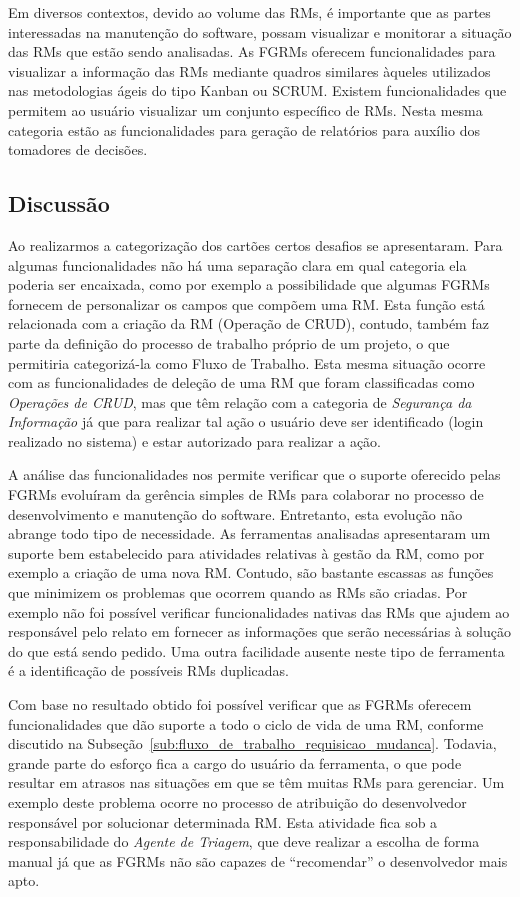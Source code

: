 Em diversos contextos, devido ao volume das RMs, é importante que as partes
interessadas na manutenção do software, possam visualizar e monitorar a situação
das RMs que estão sendo analisadas. As FGRMs oferecem funcionalidades para
visualizar a informação das RMs mediante quadros similares àqueles utilizados
nas metodologias ágeis do tipo Kanban ou SCRUM\@. Existem funcionalidades que
permitem ao usuário visualizar um conjunto específico de RMs. Nesta mesma
categoria estão as funcionalidades para geração de relatórios para auxílio dos
tomadores de decisões.

\subsection{Discussão}
\label{sec:discussao}

Ao realizarmos a categorização dos cartões certos desafios se apresentaram. Para
algumas funcionalidades não há uma separação clara em qual categoria ela poderia
ser encaixada, como por exemplo a possibilidade que algumas FGRMs fornecem de
personalizar os campos que compõem uma RM\@. Esta função está relacionada com a
criação da RM (Operação de CRUD), contudo, também faz parte da definição do
processo de trabalho próprio de um projeto, o que permitiria categorizá-la como
Fluxo de Trabalho. Esta mesma situação ocorre com as funcionalidades de deleção
de uma RM que foram classificadas como \textit{Operações de CRUD}, mas que têm
relação com a categoria de \textit{Segurança da Informação} já que para realizar
tal ação o usuário deve ser identificado (login realizado no sistema) e estar
autorizado para realizar a ação.

A análise das funcionalidades nos permite verificar que o suporte oferecido
pelas FGRMs evoluíram da gerência simples de RMs para colaborar no processo de
desenvolvimento e manutenção do software. Entretanto, esta evolução não abrange
todo tipo de necessidade. As ferramentas analisadas apresentaram um suporte bem
estabelecido para atividades relativas à gestão da RM, como por exemplo a
criação de uma nova RM\@. Contudo, são bastante escassas as funções que
minimizem os problemas que ocorrem quando as RMs são criadas. Por exemplo não
foi possível verificar funcionalidades nativas das RMs que ajudem ao responsável
pelo relato em fornecer as informações que serão necessárias à solução do que
está sendo pedido. Uma outra facilidade ausente neste tipo de ferramenta é a
identificação de possíveis RMs duplicadas.

Com base no resultado obtido foi possível verificar que as FGRMs oferecem
funcionalidades que dão suporte a todo o ciclo de vida de uma RM, conforme
discutido na Subseção~\ref{sub:fluxo_de_trabalho_requisicao_mudanca}. Todavia,
grande parte do esforço fica a cargo do usuário da ferramenta, o que pode
resultar em atrasos nas situações em que se têm muitas RMs para gerenciar. Um
exemplo deste problema ocorre no processo de atribuição do desenvolvedor
responsável por solucionar determinada RM\@. Esta atividade fica sob a
responsabilidade do \textit{Agente de Triagem}, que deve realizar a escolha de
forma manual já que as FGRMs não são capazes de ``recomendar'' o desenvolvedor
mais apto.

